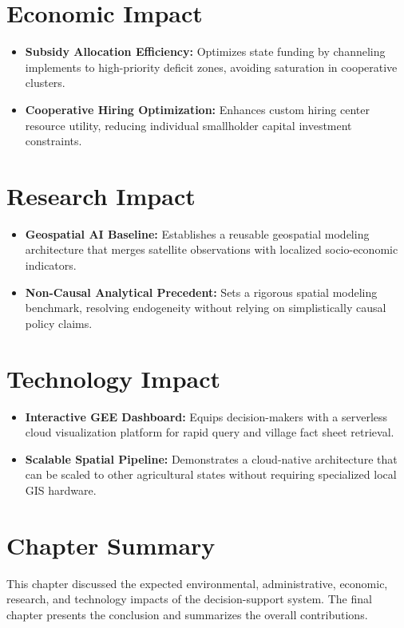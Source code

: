 \documentclass[12pt,a4paper]{report}
\begin{document}
\section{Economic Impact}
\begin{itemize}
    \item \textbf{Subsidy Allocation Efficiency:} Optimizes state funding by channeling implements to high-priority deficit zones, avoiding saturation in cooperative clusters.
    \item \textbf{Cooperative Hiring Optimization:} Enhances custom hiring center resource utility, reducing individual smallholder capital investment constraints.
\end{itemize}

\section{Research Impact}
\begin{itemize}
    \item \textbf{Geospatial AI Baseline:} Establishes a reusable geospatial modeling architecture that merges satellite observations with localized socio-economic indicators.
    \item \textbf{Non-Causal Analytical Precedent:} Sets a rigorous spatial modeling benchmark, resolving endogeneity without relying on simplistically causal policy claims.
\end{itemize}

\section{Technology Impact}
\begin{itemize}
    \item \textbf{Interactive GEE Dashboard:} Equips decision-makers with a serverless cloud visualization platform for rapid query and village fact sheet retrieval.
    \item \textbf{Scalable Spatial Pipeline:} Demonstrates a cloud-native architecture that can be scaled to other agricultural states without requiring specialized local GIS hardware.
\end{itemize}

\section{Chapter Summary}
This chapter discussed the expected environmental, administrative, economic, research, and technology impacts of the decision-support system. The final chapter presents the conclusion and summarizes the overall contributions.
\end{document}
